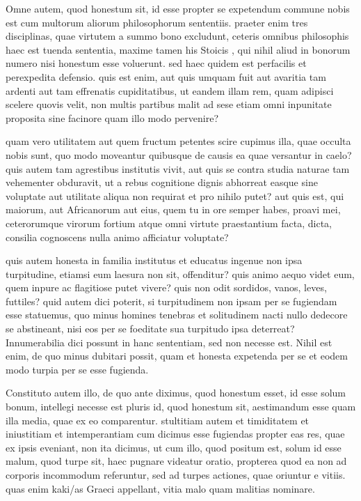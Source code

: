  Omne autem, quod honestum sit, id esse propter se expetendum commune nobis est cum multorum aliorum philosophorum sententiis. praeter enim tres disciplinas, quae virtutem a summo bono excludunt, ceteris omnibus philosophis haec est tuenda sententia, maxime tamen his Stoicis , qui nihil aliud in bonorum numero nisi honestum esse voluerunt. sed haec quidem est perfacilis et perexpedita defensio. quis est enim, aut quis umquam fuit aut avaritia tam ardenti aut tam effrenatis cupiditatibus, ut eandem illam rem, quam adipisci scelere quovis velit, non multis partibus malit ad sese etiam omni inpunitate proposita sine facinore quam illo modo pervenire?

 quam vero utilitatem aut quem fructum petentes scire cupimus illa, quae occulta nobis sunt, quo modo moveantur quibusque de causis ea quae versantur in caelo? quis autem tam agrestibus institutis vivit, aut quis se contra studia naturae tam vehementer obduravit, ut a rebus cognitione dignis abhorreat easque sine voluptate aut utilitate aliqua non requirat et pro nihilo putet? aut quis est, qui maiorum, aut Africanorum aut eius, quem tu in ore semper habes, proavi mei, ceterorumque virorum fortium atque omni virtute praestantium facta, dicta, consilia cognoscens nulla animo afficiatur voluptate?

 quis autem honesta in familia institutus et educatus ingenue non ipsa turpitudine, etiamsi eum laesura non sit, offenditur? quis animo aequo videt eum, quem inpure ac flagitiose putet vivere? quis non odit sordidos, vanos, leves, futtiles? quid autem dici poterit, si turpitudinem non ipsam per se fugiendam esse statuemus, quo minus homines tenebras et solitudinem nacti nullo dedecore se abstineant, nisi eos per se foeditate sua turpitudo ipsa deterreat? Innumerabilia dici possunt in hanc sententiam, sed non necesse est. Nihil est enim, de quo minus dubitari possit, quam et honesta expetenda per se et eodem modo turpia per se esse fugienda.

 Constituto autem illo, de quo ante diximus, quod honestum esset, id esse solum bonum, intellegi necesse est pluris id, quod honestum sit, aestimandum esse quam illa media, quae ex eo comparentur. stultitiam autem et timiditatem et iniustitiam et intemperantiam cum dicimus esse fugiendas propter eas res, quae ex ipsis eveniant, non ita dicimus, ut cum illo, quod positum est, solum id esse malum, quod turpe sit, haec pugnare videatur oratio, propterea quod ea non ad corporis incommodum referuntur, sed ad turpes actiones, quae oriuntur e vitiis. quas enim kaki/as Graeci appellant, vitia malo quam malitias nominare.

